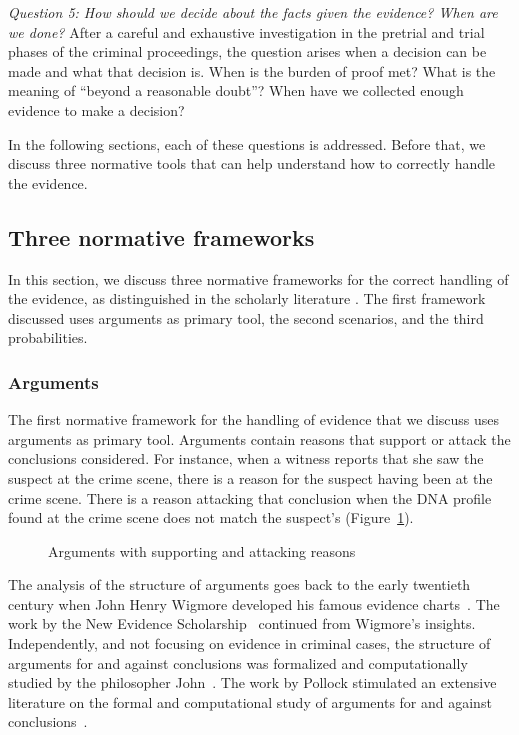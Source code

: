 \documentclass[10pt]{article}
\begin{document}
\textit{Question 5:	How should we decide about the facts given the evidence? When are we done?}
After a careful and exhaustive investigation in the pretrial and trial phases of the criminal proceedings, the question arises when a decision can be made and what that decision is. When is the burden of proof met? What is the meaning of ``beyond a reasonable doubt''? When have we collected enough evidence to make a decision?

In the following sections, each of these questions is addressed. Before that, we discuss three normative tools that can help understand how to correctly handle the evidence. 

\subsection{Three normative frameworks}

In this section, we discuss three normative frameworks for the correct handling of the evidence, as distinguished in the scholarly literature \citep{andersonEtal2005,kapteinEtal2009,dawidEtal2011}. The first framework discussed uses arguments as primary tool, the second scenarios, and the third probabilities. 

\subsubsection{Arguments}

The first normative framework for the handling of evidence that we discuss uses arguments as primary tool. Arguments contain reasons that support or attack the conclusions considered. For instance, when a witness reports that she saw the suspect at the crime scene, there is a reason for the suspect having been at the crime scene. There is a reason attacking that conclusion when the DNA profile found at the crime scene does not match the suspect's (Figure~\ref{fig:arg}). 

\begin{figure}[bt]
\centering

\caption{Arguments with supporting and attacking reasons\label{fig:arg}}
\end{figure}

The analysis of the structure of arguments goes back to the early twentieth century when John Henry Wigmore developed his famous evidence charts~\citep{wigmore1913,wigmore1931}. The work by the New Evidence Scholarship~\citep{andersonEtal2005} continued from Wigmore's insights. Independently, and not focusing on evidence in criminal cases, the structure of arguments for and against conclusions was formalized and computationally studied by the philosopher John~\citet{pollock1987,pollock1995}. The work by Pollock stimulated an extensive literature on the formal and computational study of arguments for and against conclusions~\citep{vanEemerenEtal2014Ch11}.
\end{document}
